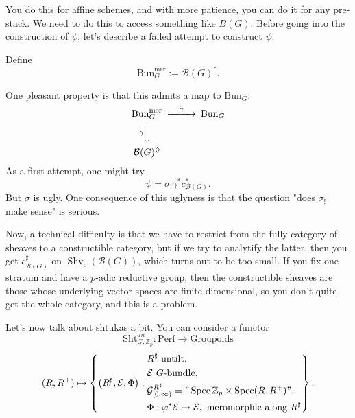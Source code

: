 \documentclass[reqno]{amsart} 
\begin{document}
You do this for affine schemes, and with more patience, you can do it for any pre-stack.  We need to do this to access something like $B(G)$.  Before going into the construction of $\psi$, let's describe a failed attempt to construct $\psi$.
\begin{definition}
  Define
  \begin{equation*}
    \mathrm{Bun}_G^{\mathrm{mer}}
    :=
    \mathcal{B}(G)^{\dagger}.
  \end{equation*}
\end{definition}
One pleasant property is that this admits a map to $\mathrm{Bun}_G$:
\begin{equation*}
  \begin{CD}         
    \mathrm{Bun}_G^{\mathrm{mer}} @>\sigma>> \mathrm{Bun}_G\\
    @V \gamma VV  @. \\
    \mathcal{B}(G)^{\Diamond} @.\\
  \end{CD}
\end{equation*}
As a first attempt, one might try
\begin{equation*}
  \psi = \sigma_{!} \gamma^\ast c^\ast_{\mathcal{B}(G)}.
\end{equation*}
But $\sigma$ is ugly.  One consequence of this uglyness is that the question "does $\sigma_{!}$ make sense" is serious.

Now, a technical difficulty is that we have to restrict from the fully category of sheaves to a constructible category, but if we try to analytify the latter, then you get $c_{\mathcal{B}(G)}^\sharp$ on $\operatorname{Shv}_c(\mathcal{B}(G))$, which turns out to be too small.  If you fix one stratum and have a $p$-adic reductive group, then the constructible sheaves are those whose underlying vector spaces are finite-dimensional, so you don't quite get the whole category, and this is a problem.

Let's now talk about shtukas a bit.  You can consider a functor
\begin{equation*}
  \mathrm{Sht}_{G, \mathbb{Z}_p}^{an} : \mathrm{Perf} \rightarrow \mathrm{Groupoids}
\end{equation*}
\begin{equation*}
  (R, R^+) \mapsto
  \left\{ \left( R^\sharp , \mathcal{E}, \Phi \right) :
    \begin{aligned}
      & R^\sharp \text{ untilt}, \\
      & \mathcal{E} \text{ $G$-bundle}, \\
      & \mathcal{G}_{[0, \infty)}^{R^\sharp}
        = "\operatorname{Spec} \mathbb{Z}_p \times \operatorname{Spec}(R, R^+)", \\
      & \Phi : \varphi^\ast \mathcal{E} \rightarrow \mathcal{E}, \text{ meromorphic along } R^\sharp
    \end{aligned}
  \right\}.
\end{equation*}
\end{document}
